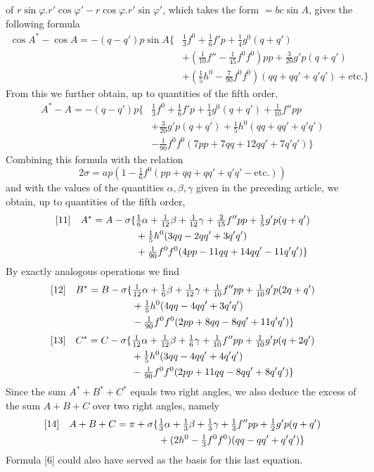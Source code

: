 %
of \(r\sin\varphi\mathord{.}r'\cos\varphi'-r\cos\varphi\mathord{.}r'\sin\varphi'\), which takes the form \(=bc\sin A\), gives the following formula
\[
\begin{aligned}
\cos A^*-\cos A=-(q-q')p\sin A\{&\tfrac{1}{3}f^0+\tfrac{1}{6}f'p+\tfrac{1}{4}g^0(q+q')\\
&+(\tfrac{1}{10}f''-\tfrac{1}{45}f^0f^0)pp+\tfrac{3}{20}g'p(q+q')\\
&+(\tfrac{1}{5}h^0-\tfrac{7}{90}f^0f^0)(qq+qq'+q'q')+\text{etc.}\}
\end{aligned}
\]
From this we further obtain, up to quantities of the fifth order,
\[
\begin{aligned}
A^*-A=-(q-q')p\{&\tfrac{1}{3}f^0+\tfrac{1}{6}f'p+\tfrac{1}{4}g^0(q+q')+\tfrac{1}{10}f''pp\\
&+\tfrac{3}{20}g'p(q+q')+\tfrac{1}{5}h^0(qq+qq'+q'q')\\
&-\tfrac{1}{90}f^0f^0(7pp+7qq+12qq'+7q'q')\}
\end{aligned}
\]
Combining this formula with the relation
\[
2\sigma=ap(1-\tfrac{1}{6}f^0(pp+qq+qq'+q'q'-\text{etc.}))
\]
and with the values of the quantities \(\alpha,\beta,\gamma\) given in the preceding article, we obtain, up to quantities of the fifth order,
\[
\begin{aligned}
\relax[11]\quad A^*=A-\sigma\{&\tfrac{1}{6}\alpha+\tfrac{1}{12}\beta+\tfrac{1}{12}\gamma+\tfrac{2}{15}f''pp+\tfrac{1}{5}g'p(q+q')\\
&+\tfrac{1}{5}h^0(3qq-2qq'+3q'q')\\
&+\tfrac{1}{90}f^0f^0(4pp-11qq+14qq'-11q'q')\}
\end{aligned}
\]
By exactly analogous operations we find
\[
\begin{aligned}
\relax[12]\quad B^*=B-\sigma\{&\tfrac{1}{12}\alpha+\tfrac{1}{6}\beta+\tfrac{1}{12}\gamma+\tfrac{1}{10}f''pp+\tfrac{1}{10}g'p(2q+q')\\
&+\tfrac{1}{5}h^0(4qq-4qq'+3q'q')\\
&-\tfrac{1}{90}f^0f^0(2pp+8qq-8qq'+11q'q')\}
\end{aligned}
\]
\[
\begin{aligned}
\relax[13]\quad C^*=C-\sigma\{&\tfrac{1}{12}\alpha+\tfrac{1}{12}\beta+\tfrac{1}{6}\gamma+\tfrac{1}{10}f''pp+\tfrac{1}{10}g'p(q+2q')\\
&+\tfrac{1}{5}h^0(3qq-4qq'+4q'q')\\
&-\tfrac{1}{90}f^0f^0(2pp+11qq-8qq'+8q'q')\}
\end{aligned}
\]
Since the sum \(A^*+B^*+C^*\) equals two right angles, we also deduce the excess of the sum \(A+B+C\) over two right angles, namely
\[
\begin{aligned}
\relax[14]\quad A+B+C=\pi+\sigma\{&\tfrac{1}{3}\alpha+\tfrac{1}{3}\beta+\tfrac{1}{3}\gamma+\tfrac{1}{3}f''pp+\tfrac{1}{2}g'p(q+q')\\
&+(2h^0-\tfrac{1}{3}f^0f^0)(qq-qq'+q'q')\}
\end{aligned}
\]
Formula [6] could also have served as the basis for this last equation.
